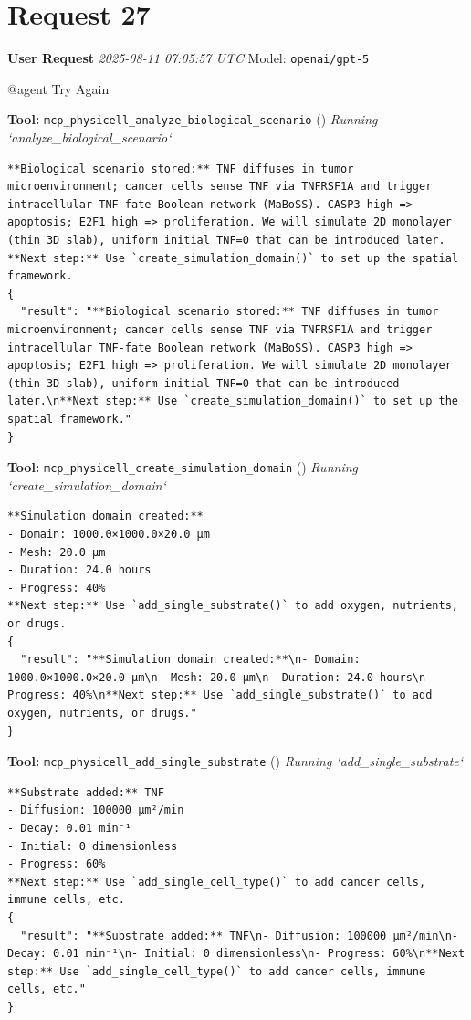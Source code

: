 \documentclass[11pt,a4paper]{article}
\begin{document}
\section{Request 27}
\begin{userbox}
\textbf{User Request}
\quad \textit{2025-08-11 07:05:57 UTC}
\quad Model: \texttt{openai/gpt-5}

@agent Try Again

\end{userbox}
\begin{toolokbox}
\textbf{Tool:} \texttt{mcp\_physicell\_analyze\_biological\_scenario} (\checkmark)
\textit{Running `analyze\_biological\_scenario`}
\begin{lstlisting}
**Biological scenario stored:** TNF diffuses in tumor microenvironment; cancer cells sense TNF via TNFRSF1A and trigger intracellular TNF-fate Boolean network (MaBoSS). CASP3 high => apoptosis; E2F1 high => proliferation. We will simulate 2D monolayer (thin 3D slab), uniform initial TNF=0 that can be introduced later.
**Next step:** Use `create_simulation_domain()` to set up the spatial framework.
{
  "result": "**Biological scenario stored:** TNF diffuses in tumor microenvironment; cancer cells sense TNF via TNFRSF1A and trigger intracellular TNF-fate Boolean network (MaBoSS). CASP3 high => apoptosis; E2F1 high => proliferation. We will simulate 2D monolayer (thin 3D slab), uniform initial TNF=0 that can be introduced later.\n**Next step:** Use `create_simulation_domain()` to set up the spatial framework."
}
\end{lstlisting}
\end{toolokbox}
\begin{toolokbox}
\textbf{Tool:} \texttt{mcp\_physicell\_create\_simulation\_domain} (\checkmark)
\textit{Running `create\_simulation\_domain`}
\begin{lstlisting}
**Simulation domain created:**
- Domain: 1000.0×1000.0×20.0 μm
- Mesh: 20.0 μm
- Duration: 24.0 hours
- Progress: 40%
**Next step:** Use `add_single_substrate()` to add oxygen, nutrients, or drugs.
{
  "result": "**Simulation domain created:**\n- Domain: 1000.0×1000.0×20.0 μm\n- Mesh: 20.0 μm\n- Duration: 24.0 hours\n- Progress: 40%\n**Next step:** Use `add_single_substrate()` to add oxygen, nutrients, or drugs."
}
\end{lstlisting}
\end{toolokbox}
\begin{toolokbox}
\textbf{Tool:} \texttt{mcp\_physicell\_add\_single\_substrate} (\checkmark)
\textit{Running `add\_single\_substrate`}
\begin{lstlisting}
**Substrate added:** TNF
- Diffusion: 100000 μm²/min
- Decay: 0.01 min⁻¹
- Initial: 0 dimensionless
- Progress: 60%
**Next step:** Use `add_single_cell_type()` to add cancer cells, immune cells, etc.
{
  "result": "**Substrate added:** TNF\n- Diffusion: 100000 μm²/min\n- Decay: 0.01 min⁻¹\n- Initial: 0 dimensionless\n- Progress: 60%\n**Next step:** Use `add_single_cell_type()` to add cancer cells, immune cells, etc."
}
\end{lstlisting}
\end{toolokbox}
\end{document}
